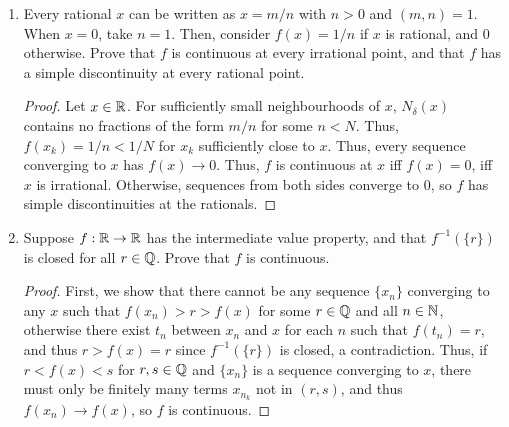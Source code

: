 \begin{enumerate}
\begin{proof}
    Following the hint, let $E_<$ be the set of all simple discontinuities $x$ of $f$ such that $f(x-) < f(x+)$. Then, associate to each $x \in E_<$ a triple of rational numbers $(p, q, r)$ such that $f(x-) < p < f(x+)$, $a < q < t < x$ implies $f(t) < p$, and $x < t < r < b$ implies $f(t) > p$. We claim that every triple represents a unique simple discontinuity of $f$:

    Suppose that $x$ and $x'$ are simple discontinuities and $x < x'$ WLOG, both represented by the triples $(p, q, r)$. Then in the interval $(x, x')$ lie in both the intervals $(x, r)$ and $(q, x')$, and thus $f(t)$ must be both less than, and greater than, $p$ at the same time, a contradiction. Thus, we must have $x = x'$, as required.

    We can define $E_>$ and associate triples a similar way. For $E_=$, we associate to each discontinuity $(p, q, r)$ where $p$ is between $f(x)$ and $f(x-)=f(x+)$, $q$ such that $f(t) < p$ in $(q, x)$ and $(x, r)$. Again, these triples map uniquely from the discontinuities in $E_=$. Since each of these sets must be at most countable, their union is also at most countable.
\end{proof}

\item %
Every rational $x$ can be written as $x = m/n$ with $n > 0$ and $(m, n) = 1$. When $x = 0$, take $n = 1$. Then, consider $f(x) = 1/n$ if $x$ is rational, and 0 otherwise. Prove that $f$ is continuous at every irrational point, and that $f$ has a simple discontinuity at every rational point.

\begin{proof}
    Let $x \in \mathbb{R}$. For sufficiently small neighbourhoods of $x$, $N_\delta(x)$ contains no fractions of the form $m / n$ for some $n < N$. Thus, $f(x_k) = 1/n < 1/N$ for $x_k$ sufficiently close to $x$. Thus, every sequence converging to $x$ has $f(x) \to 0$. Thus, $f$ is continuous at $x$ iff $f(x) = 0$, iff $x$ is irrational. Otherwise, sequences from both sides converge to $0$, so $f$ has simple discontinuities at the rationals. 
\end{proof}

\item %
    Suppose $f: \mathbb{R} \rightarrow \mathbb{R}$ has the intermediate value property, and that $f^{-1}(\{r\})$ is closed for all $r \in \mathbb{Q}$. Prove that $f$ is continuous.
\begin{proof}
    First, we show that there cannot be any sequence $\{x_n\}$ converging to any $x$ such that $f(x_n) > r > f(x)$ for some $r \in \mathbb{Q}$ and all $n \in \mathbb{N}$, otherwise there exist $t_n$ between $x_n$ and $x$ for each $n$ such that $f(t_n) = r$, and thus $r > f(x) = r$ since $f^{-1}(\{r\})$ is closed, a contradiction. Thus, if $r < f(x) < s$ for $r, s \in \mathbb{Q}$ and $\{x_n\}$ is a sequence converging to $x$, there must only be finitely many terms $x_{n_k}$ not in $(r, s)$, and thus $f(x_n) \to f(x)$, so $f$ is continuous.
\end{proof}


\end{enumerate}
